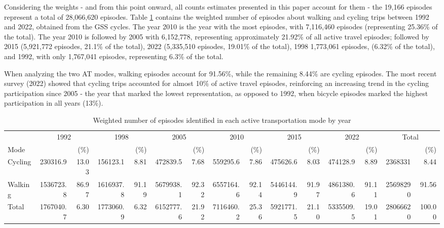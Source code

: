 \documentclass[preprint, 3p,
authoryear]{elsarticle} %
\begin{document}
Considering the weights - and from this point onward, all counts
estimates presented in this paper account for them - the 19,166 episodes
represent a total of 28,066,620 episodes. Table
\ref{tab:episodes-count-percentages} contains the weighted number of
episodes about walking and cycling trips between 1992 and 2022, obtained
from the GSS cycles. The year 2010 is the year with the most episodes,
with 7,116,460 episodes (representing 25.36\% of the total). The year
2010 is followed by 2005 with 6,152,778, representing approximately
21.92\% of all active travel episodes; followed by 2015 (5,921,772
episodes, 21.1\% of the total), 2022 (5,335,510 episodes, 19.01\% of the
total), 1998 1,773,061 episodes, (6.32\% of the total), and 1992, with
only 1,767,041 episodes, representing 6.3\% of the total.

When analyzing the two AT modes, walking episodes account for 91.56\%,
while the remaining 8.44\% are cycling episodes. The most recent survey
(2022) showed that cycling trips accounted for almost 10\% of active
travel episodes, reinforcing an increasing trend in the cycling
participation since 2005 - the year that marked the lowest
representation, as opposed to 1992, when bicycle episodes marked the
highest participation in all years (13\%).

\begingroup\fontsize{6}{8}\selectfont

\begin{longtable}[t]{lrrrrrrrrrrrrrr}
\caption{\label{tab:bulding table-01}\label{tab:episodes-count-percentages}Weighted number of episodes identified in each active transportation mode by year}\\
\toprule
\multicolumn{1}{c}{ } & \multicolumn{2}{c}{1992} & \multicolumn{2}{c}{1998} & \multicolumn{2}{c}{2005} & \multicolumn{2}{c}{2010} & \multicolumn{2}{c}{2015} & \multicolumn{2}{c}{2022} & \multicolumn{2}{c}{Total} \\
\cmidrule(l{3pt}r{3pt}){2-3} \cmidrule(l{3pt}r{3pt}){4-5} \cmidrule(l{3pt}r{3pt}){6-7} \cmidrule(l{3pt}r{3pt}){8-9} \cmidrule(l{3pt}r{3pt}){10-11} \cmidrule(l{3pt}r{3pt}){12-13} \cmidrule(l{3pt}r{3pt}){14-15}
Mode &  & (\%) &  & (\%) &  & (\%) &  & (\%) &  & (\%) &  & (\%) &  & (\%)\\
\midrule
Cycling & 230316.9 & 13.03 & 156123.1 & 8.81 & 472839.5 & 7.68 & 559295.6 & 7.86 & 475626.6 & 8.03 & 474128.9 & 8.89 & 2368331 & 8.44\\
Walking & 1536723.8 & 86.97 & 1616937.8 & 91.19 & 5679938.1 & 92.32 & 6557164.6 & 92.14 & 5446144.9 & 91.97 & 4861380.6 & 91.11 & 25698290 & 91.56\\
Total & 1767040.7 & 6.30 & 1773060.9 & 6.32 & 6152777.6 & 21.92 & 7116460.2 & 25.36 & 5921771.5 & 21.10 & 5335509.5 & 19.01 & 28066620 & 100.00\\
\bottomrule
\end{longtable}
\endgroup{}
\end{document}

